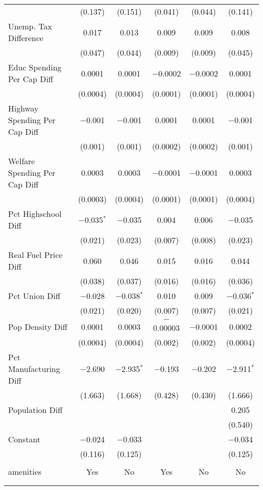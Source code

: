 \begin{table}[!htbp]
\begin{tabular}{@{\extracolsep{5pt}}lccccc}
  & (0.137) & (0.151) & (0.041) & (0.044) & (0.141) \\ 
  Unemp. Tax Difference & 0.017 & 0.013 & 0.009 & 0.009 & 0.008 \\ 
  & (0.047) & (0.044) & (0.009) & (0.009) & (0.045) \\ 
  Educ Spending Per Cap Diff & 0.0001 & 0.0001 & $-$0.0002 & $-$0.0002 & 0.0001 \\ 
  & (0.0004) & (0.0004) & (0.0001) & (0.0001) & (0.0004) \\ 
  Highway Spending Per Cap Diff & $-$0.001 & $-$0.001 & 0.0001 & 0.0001 & $-$0.001 \\ 
  & (0.001) & (0.001) & (0.0002) & (0.0002) & (0.001) \\ 
  Welfare Spending Per Cap Diff & 0.0003 & 0.0003 & $-$0.0001 & $-$0.0001 & 0.0003 \\ 
  & (0.0003) & (0.0004) & (0.0001) & (0.0001) & (0.0004) \\ 
  Pct Highschool Diff & $-$0.035$^{*}$ & $-$0.035 & 0.004 & 0.006 & $-$0.035 \\ 
  & (0.021) & (0.023) & (0.007) & (0.008) & (0.023) \\ 
  Real Fuel Price Diff & 0.060 & 0.046 & 0.015 & 0.016 & 0.044 \\ 
  & (0.038) & (0.037) & (0.016) & (0.016) & (0.036) \\ 
  Pct Union Diff & $-$0.028 & $-$0.038$^{*}$ & 0.010 & 0.009 & $-$0.036$^{*}$ \\ 
  & (0.021) & (0.020) & (0.007) & (0.007) & (0.021) \\ 
  Pop Density Diff & 0.0001 & 0.0003 & $-$0.00003 & $-$0.0001 & 0.0002 \\ 
  & (0.0004) & (0.0004) & (0.002) & (0.002) & (0.0004) \\ 
  Pct Manufacturing Diff & $-$2.690 & $-$2.935$^{*}$ & $-$0.193 & $-$0.202 & $-$2.911$^{*}$ \\ 
  & (1.663) & (1.668) & (0.428) & (0.430) & (1.666) \\ 
  Population Diff &  &  &  &  & 0.205 \\ 
  &  &  &  &  & (0.540) \\ 
  Constant & $-$0.024 & $-$0.033 &  &  & $-$0.034 \\ 
  & (0.116) & (0.125) &  &  & (0.125) \\ 
 \hline \\[-1.8ex] 
amenities & Yes & No & Yes & No & No \\ 
\hline \\[-1.8ex] 
\hline 
\hline \\[-1.8ex] 
\end{tabular} 
\end{table} 
